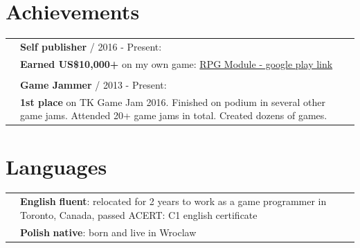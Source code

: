 \documentclass[12pt,a4paper]{article}
\begin{document}
\begin{multicols}{2}
\section*{Achievements}
	\begin{tabular}  { >{\RaggedLeft}p{0cm}   p{8.5cm} }  
		& \textbf{Self publisher} / 2016 - Present: \\
		& \hspace{5mm} \textbf{Earned US\$10,000+} on my own game: {\href{https://play.google.com/store/apps/details?id=com.wyspianStudios.rpgModuleFull}{RPG Module - google play link}}   \\
		 & \\
		 & \textbf{Game Jammer} / 2013 - Present: \\
		& \hspace{5mm} \textbf{1st place} on TK Game Jam 2016. Finished on podium in several other game jams. Attended 20+ game jams in total. Created dozens of  games.  \\
	\end{tabular} 

\section*{Languages }
\begin{tabular}{ >{\RaggedLeft}p{0cm}  p{8.5cm}   }
	& \textbf{English}   \textbf{fluent}: relocated for 2 years to work as a game programmer in Toronto, Canada, passed ACERT: C1 english certificate  \\
	&  \textbf{Polish} \textbf{native}: born and live in Wroclaw \\	 
\end{tabular}

\vfill

\end{multicols}



\vfill
\end{document}
